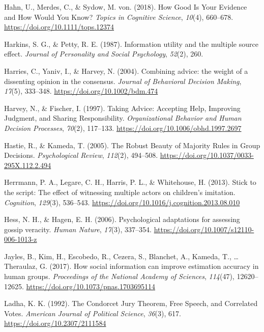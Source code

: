 \documentclass[
  doc,floatsintext]{apa6}
\newlength{\cslhangindent}
\newenvironment{CSLReferences}[2] %
 {\begin{list}{}{%
  \setlength{\itemindent}{0pt}
  \setlength{\leftmargin}{0pt}
  \setlength{\parsep}{0pt}
  \ifodd #1
   \setlength{\leftmargin}{\cslhangindent}
   \setlength{\itemindent}{-1\cslhangindent}
  \fi
  \setlength{\itemsep}{#2\baselineskip}}}
 {\end{list}}
\begin{document}
\begin{CSLReferences}{1}{0}
Hahn, U., Merdes, C., \& Sydow, M. von. (2018). How Good Is Your Evidence and How Would You Know? \emph{Topics in Cognitive Science}, \emph{10}(4), 660--678. \url{https://doi.org/10.1111/tops.12374}

Harkins, S. G., \& Petty, R. E. (1987). Information utility and the multiple source effect. \emph{Journal of Personality and Social Psychology}, \emph{52}(2), 260.

Harries, C., Yaniv, I., \& Harvey, N. (2004). Combining advice: the weight of a dissenting opinion in the consensus. \emph{Journal of Behavioral Decision Making}, \emph{17}(5), 333--348. \url{https://doi.org/10.1002/bdm.474}

Harvey, N., \& Fischer, I. (1997). Taking Advice: Accepting Help, Improving Judgment, and Sharing Responsibility. \emph{Organizational Behavior and Human Decision Processes}, \emph{70}(2), 117--133. \url{https://doi.org/10.1006/obhd.1997.2697}

Hastie, R., \& Kameda, T. (2005). The Robust Beauty of Majority Rules in Group Decisions. \emph{Psychological Review}, \emph{112}(2), 494--508. \url{https://doi.org/10.1037/0033-295X.112.2.494}

Herrmann, P. A., Legare, C. H., Harris, P. L., \& Whitehouse, H. (2013). Stick to the script: The effect of witnessing multiple actors on children{'}s imitation. \emph{Cognition}, \emph{129}(3), 536--543. \url{https://doi.org/10.1016/j.cognition.2013.08.010}

Hess, N. H., \& Hagen, E. H. (2006). Psychological adaptations for assessing gossip veracity. \emph{Human Nature}, \emph{17}(3), 337--354. \url{https://doi.org/10.1007/s12110-006-1013-z}

Jayles, B., Kim, H., Escobedo, R., Cezera, S., Blanchet, A., Kameda, T., \ldots{} Theraulaz, G. (2017). How social information can improve estimation accuracy in human groups. \emph{Proceedings of the National Academy of Sciences}, \emph{114}(47), 12620--12625. \url{https://doi.org/10.1073/pnas.1703695114}

Ladha, K. K. (1992). The Condorcet Jury Theorem, Free Speech, and Correlated Votes. \emph{American Journal of Political Science}, \emph{36}(3), 617. \url{https://doi.org/10.2307/2111584}


\end{CSLReferences}
\end{document}
